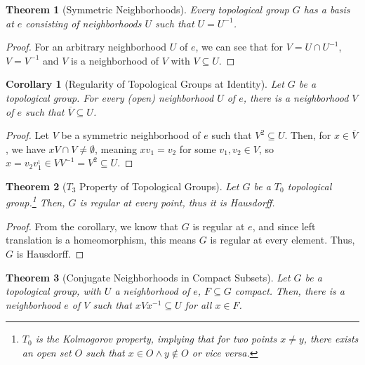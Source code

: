 \documentclass[10pt]{extarticle}
\theoremstyle{plain}
\newtheorem*{theorem}{Theorem}
\newtheorem*{corollary}{Corollary}
\theoremstyle{definition}
\theoremstyle{note}
\begin{document}
\begin{theorem}[Symmetric Neighborhoods]
  Every topological group $G$ has a basis at $e$ consisting of neighborhoods $U$ such that $U = U^{-1}$.
\end{theorem}
\begin{proof}
  For an arbitrary neighborhood $U$ of $e$, we can see that for $V = U\cap U^{-1}$, $V = V^{-1}$ and $V$ is a neighborhood of $V$ with $V\subseteq U$.
\end{proof}
\begin{corollary}[Regularity of Topological Groups at Identity]
  Let $G$ be a topological group. For every (open) neighborhood $U$ of $e$, there is a neighborhood $V$ of $e$ such that $\overline{V} \subseteq U$.
\end{corollary}
\begin{proof}
  Let $V$ be a symmetric neighborhood of $e$ such that $V^{2}\subseteq U$. Then, for $x\in \overline{V}$, we have $xV \cap V \neq \emptyset$, meaning $xv_1 = v_2$ for some $v_1,v_2 \in V$, so $x = v_2v_1^{_1}\in VV^{-1} = V^2 \subseteq U$.
\end{proof}
\begin{theorem}[$T_3$ Property of Topological Groups]
  Let $G$ be a $T_0$ topological group.\footnote{$T_0$ is the Kolmogorov property, implying that for two points $x\neq y$, there exists an open set $O$ such that $x\in O\wedge y\notin O$ or vice versa.} Then, $G$ is regular at every point, thus it is Hausdorff.
\end{theorem}
\begin{proof}
  From the corollary, we know that $G$ is regular at $e$, and since left translation is a homeomorphism, this means $G$ is regular at every element. Thus, $G$ is Hausdorff.
\end{proof}
\begin{theorem}[Conjugate Neighborhoods in Compact Subsets]
  Let $G$ be a topological group, with $U$ a neighborhood of $e$, $F \subseteq G$ compact. Then, there is a neighborhood $e$ of $V$ such that $xVx^{-1} \subseteq U$ for all $x\in F$.
\end{theorem}
\end{document}
